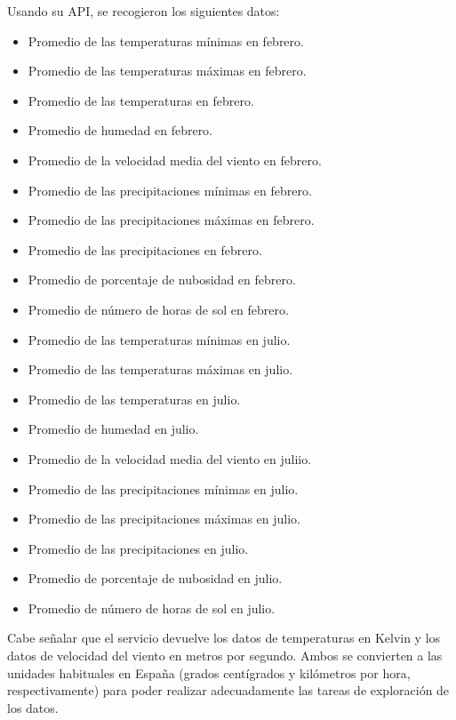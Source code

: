 \begin{enumerate}
    Usando su API, se recogieron los siguientes datos:
    
    \begin{itemize}
        \item Promedio de las temperaturas mínimas en febrero.
        \item Promedio de las temperaturas máximas en febrero.
        \item Promedio de las temperaturas en febrero.
        \item Promedio de humedad en febrero.
        \item Promedio de la velocidad media del viento en febrero.
        \item Promedio de las precipitaciones mínimas en febrero.
        \item Promedio de las precipitaciones máximas en febrero.
        \item Promedio de las precipitaciones en febrero.
        \item Promedio de porcentaje de nubosidad en febrero.
        \item Promedio de número de horas de sol en febrero.
    
        \item Promedio de las temperaturas mínimas en julio.
        \item Promedio de las temperaturas máximas en julio.
        \item Promedio de las temperaturas en julio.
        \item Promedio de humedad en julio.
        \item Promedio de la velocidad media del viento en juliio.
        \item Promedio de las precipitaciones mínimas en julio.
        \item Promedio de las precipitaciones máximas en julio.
        \item Promedio de las precipitaciones en julio.
        \item Promedio de porcentaje de nubosidad en julio.
        \item Promedio de número de horas de sol en julio.
    \end{itemize}
    
    
    Cabe señalar que el servicio devuelve los datos de temperaturas en Kelvin y los datos de velocidad del viento en metros por segundo. Ambos se convierten a las unidades habituales en España (grados centígrados y kilómetros por hora, respectivamente) para poder realizar adecuadamente las tareas de exploración de los datos.
    

\end{enumerate}
